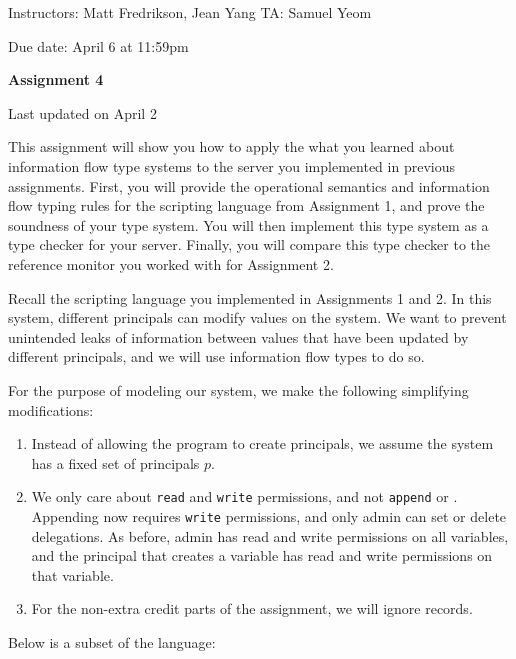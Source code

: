 \documentclass[11pt]{article}
\newcommand*{\stuname}{}
\newcommand*{\assignmentnumb}{4}
\begin{document}
\centerline{Instructors: Matt Fredrikson, Jean Yang \hfill TA: Samuel Yeom} 
\vspace{0.5ex}
Due date: April 6 at 11:59pm \\
\vspace{1.5ex}
\centerline{\Large\bf Assignment \assignmentnumb}
\vspace{0.5ex}
\centerline{\Large\bf \stuname}
\parbox{\textwidth}{\hfill \color{red} Last updated on April 2}

This assignment will show you how to apply the what you learned about information flow type systems to the server you implemented in previous assignments. First, you will provide the operational semantics and information flow typing rules for the scripting language from Assignment 1, and prove the soundness of your type system. You will then implement this type system as a type checker for your server. Finally, you will compare this type checker to the reference monitor you worked with for Assignment 2.

Recall the scripting language you implemented in Assignments 1 and 2. In this system, different principals can modify values on the system. We want to prevent unintended leaks of information between values that have been updated by different principals, and we will use information flow types to do so.

For the purpose of modeling our system, we make the following simplifying modifications:
\begin{enumerate}
\item Instead of allowing the program to create principals, we assume the system has a fixed set of principals $p$.
\item We only care about \texttt{read} and \texttt{write} permissions, and not \texttt{append} or . Appending now requires \texttt{write} permissions, and only admin can set or delete delegations. As before, admin has read and write permissions on all variables, and the principal that creates a variable has read and write permissions on that variable.
\item For the non-extra credit parts of the assignment, we will ignore records.
\end{enumerate}
Below is a subset of the language:
\end{document}
